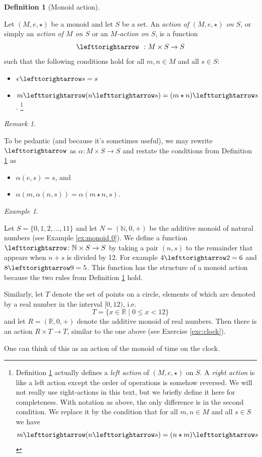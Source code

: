 \documentclass{book}
\def\RR{{\mathbb R}}
\def\NN{{\mathbb N}}
\def\to{\rightarrow}
\def\taking{\colon}
\def\|{{\;|\;}}
\def\acts{\lefttorightarrow}
\theoremstyle{remark}
\newtheorem{remark}[subsubsection]{Remark}
\newtheorem{example}[subsubsection]{Example}
\theoremstyle{definition}
\newtheorem{definition}[subsubsection]{Definition}
\begin{document}
\begin{definition}[Monoid action]\label{def:monoid action}

Let $(M,e,\star)$ be a monoid and let $S$ be a set. An {\em action of $(M,e,\star)$ on $S$}, or simply an {\em action of $M$ on $S$} or an {\em $M$-action on $S$}, is a function $$\acts\;\;\taking M\times S\to S$$\index{a symbol!$\acts$} such that the following conditions hold for all $m,n\in M$ and all $s\in S$:
\begin{itemize}
\item $e\acts s=s$
\item $m\acts(n\acts s)=(m\star n)\acts s$.
\footnote{
Definition \ref{def:monoid action} actually defines a {\em left action} of $(M,e,\star)$ on $S$. A {\em right action} is like a left action except the order of operations is somehow reversed. We will not really use right-actions in this text, but we briefly define it here for completeness. With notation as above, the only difference is in the second condition. We replace it by the condition that for all $m,n\in M$ and all $s\in S$ we have 
$$m\acts(n\acts s)=(n\star m)\acts s
$$}
\end{itemize}

\end{definition}

\begin{remark}\label{rmk:monoid action}

To be pedantic (and because it's sometimes useful), we may rewrite $\acts$ as $\alpha\taking M\times S\to S$ and restate the conditions from Definition \ref{def:monoid action} as
\begin{itemize}
\item $\alpha(e,s)=s$, and
\item $\alpha(m,\alpha(n,s))=\alpha(m\star n,s)$.
\end{itemize}

\end{remark}

\begin{example}\label{ex:clocks}

Let $S=\{0,1,2,\ldots,11\}$ and let $N=(\NN,0,+)$ be the additive monoid of natural numbers (see Example \ref{ex:monoid 0}).  We define a function $\acts\taking\NN\times S\to S$ by taking a pair $(n,s)$ to the remainder that appears when $n+s$ is divided by 12. For example $4\acts 2=6$ and $8\acts 9 = 5$. This function has the structure of a monoid action because the two rules from Definition \ref{def:monoid action} hold.

Similarly, let $T$ denote the set of points on a circle, elements of which are denoted by a real number in the interval $[0,12)$, i.e. $$T=\{x\in\RR\|0\leq x< 12\}$$ and let $R=(\RR,0,+)$ denote the additive monoid of real numbers. Then there is an action $R\times T\to T$, similar to the one above (see Exercise \ref{exc:clock}).

One can think of this as an action of the monoid of time on the clock.

\end{example}
\end{document}
